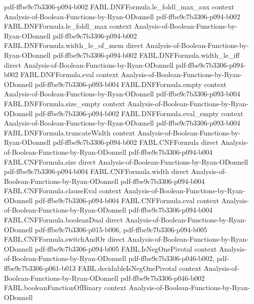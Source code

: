 \begin{theorem}
  {pdf-ffbe9c7b3306-p094-b002}
\proofstep
  {FABL.DNFFormula.le_foldl_max_aux}
  {context}
  {Analysis-of-Boolean-Functions-by-Ryan-ODonnell}
  {pdf-ffbe9c7b3306-p094-b002}
\proofstep
  {FABL.DNFFormula.le_foldl_max}
  {context}
  {Analysis-of-Boolean-Functions-by-Ryan-ODonnell}
  {pdf-ffbe9c7b3306-p094-b002}
\proofstep
  {FABL.DNFFormula.width_le_of_mem}
  {direct}
  {Analysis-of-Boolean-Functions-by-Ryan-ODonnell}
  {pdf-ffbe9c7b3306-p094-b002}
\proofstep
  {FABL.DNFFormula.width_le_iff}
  {direct}
  {Analysis-of-Boolean-Functions-by-Ryan-ODonnell}
  {pdf-ffbe9c7b3306-p094-b002}
\proofstep
  {FABL.DNFFormula.eval}
  {context}
  {Analysis-of-Boolean-Functions-by-Ryan-ODonnell}
  {pdf-ffbe9c7b3306-p093-b004}
\proofstep
  {FABL.DNFFormula.empty}
  {context}
  {Analysis-of-Boolean-Functions-by-Ryan-ODonnell}
  {pdf-ffbe9c7b3306-p093-b004}
\proofstep
  {FABL.DNFFormula.size_empty}
  {context}
  {Analysis-of-Boolean-Functions-by-Ryan-ODonnell}
  {pdf-ffbe9c7b3306-p094-b002}
\proofstep
  {FABL.DNFFormula.eval_empty}
  {context}
  {Analysis-of-Boolean-Functions-by-Ryan-ODonnell}
  {pdf-ffbe9c7b3306-p093-b004}
\proofstep
  {FABL.DNFFormula.truncateWidth}
  {context}
  {Analysis-of-Boolean-Functions-by-Ryan-ODonnell}
  {pdf-ffbe9c7b3306-p094-b002}
\proofstep
  {FABL.CNFFormula}
  {direct}
  {Analysis-of-Boolean-Functions-by-Ryan-ODonnell}
  {pdf-ffbe9c7b3306-p094-b004}
\proofstep
  {FABL.CNFFormula.size}
  {direct}
  {Analysis-of-Boolean-Functions-by-Ryan-ODonnell}
  {pdf-ffbe9c7b3306-p094-b004}
\proofstep
  {FABL.CNFFormula.width}
  {direct}
  {Analysis-of-Boolean-Functions-by-Ryan-ODonnell}
  {pdf-ffbe9c7b3306-p094-b004}
\proofstep
  {FABL.CNFFormula.clauseEval}
  {context}
  {Analysis-of-Boolean-Functions-by-Ryan-ODonnell}
  {pdf-ffbe9c7b3306-p094-b004}
\proofstep
  {FABL.CNFFormula.eval}
  {context}
  {Analysis-of-Boolean-Functions-by-Ryan-ODonnell}
  {pdf-ffbe9c7b3306-p094-b004}
\proofstep
  {FABL.CNFFormula.booleanDual}
  {direct}
  {Analysis-of-Boolean-Functions-by-Ryan-ODonnell}
  {pdf-ffbe9c7b3306-p015-b006,
    pdf-ffbe9c7b3306-p094-b005}
\proofstep
  {FABL.CNFFormula.switchAndOr}
  {direct}
  {Analysis-of-Boolean-Functions-by-Ryan-ODonnell}
  {pdf-ffbe9c7b3306-p094-b005}
\proofstep
  {FABL.IsNegOnePivotal}
  {context}
  {Analysis-of-Boolean-Functions-by-Ryan-ODonnell}
  {pdf-ffbe9c7b3306-p046-b002,
    pdf-ffbe9c7b3306-p061-b013}
\proofstep
  {FABL.decidableIsNegOnePivotal}
  {context}
  {Analysis-of-Boolean-Functions-by-Ryan-ODonnell}
  {pdf-ffbe9c7b3306-p046-b002}
\proofstep
  {FABL.booleanFunctionOfBinary}
  {context}
  {Analysis-of-Boolean-Functions-by-Ryan-ODonnell}

\end{theorem}
